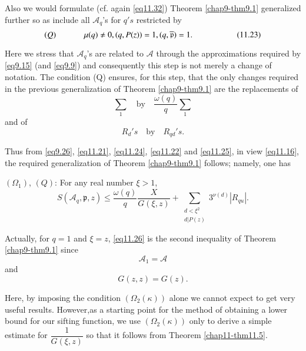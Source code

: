 Also we would formulate (cf. again \eqref{eq11.32}) Theorem
\ref{chap9-thm9.1} generalized further so as include all
$\mathscr{A}_q$'s for $q's$ restricted by  
\begin{equation*}
(Q) \hspace{1.2cm} \mu (q) \neq 0,  (q,P(z))=1,
  (q,\overline{\mathfrak{p}}) = 1. \hspace{1.2cm} 
\tag{11.23}\label{eq11.23} 
\end{equation*} 

Here we stress that $\mathscr{A}_q$'s are related to $\mathscr{A}$
through the approximations required by \eqref{eq9.15} (and \eqref{eq9.9}) and
consequently this step is not merely a change of notation. The
condition (Q) ensures, for this step, that the only changes required
in the previous generalization of Theorem \ref{chap9-thm9.1} are the
replacements of  
\begin{equation*}
\sum_1\quad \text{by}\quad \frac{\omega(q)}{q} \sum_1
\tag{11.24}\label{eq11.24} 
\end{equation*} 
and of
\begin{equation*}
R_d's \quad \text{by} \quad R_{qd}'s.\tag{11.25}\label{eq11.25} 
\end{equation*} 

Thus from \eqref{eq9.26}, \eqref{eq11.21}, \eqref{eq11.24},
\eqref{eq11.22} and \eqref{eq11.25},
in view \eqref{eq11.16}, the required generalization of Theorem
\ref{chap9-thm9.1} follows; namely, one has  

\begin{theorem}\label{chap11-thm11.5}
$(\Omega_1)$, $(Q)$: For any real number $\xi > 1$,
\begin{equation*}
S(\mathscr{A}_q, \mathfrak{p},z) \le \frac{\omega(q)} {q} \frac{X} {G
  (\xi,z)} + \sum_{\substack{d<\xi^2 \\ d|P(z)}} 3^{\nu(d)}
|R_{qu}|. \tag{11.26}\label{eq11.26} 
\end{equation*} 

Actually, for $q = 1$ and $\xi =z$, \eqref{eq11.26} is the second
inequality of Theorem \ref{chap9-thm9.1} since 
\begin{equation*}
\mathscr{A}_1 = \mathscr{A}\tag{11.27}
\end{equation*}\pageoriginale
and
\begin{equation*}
G (z,z) = G(z).\tag{11.28}\label{eq11.28}
\end{equation*} 
\end{theorem}

Here, by imposing the condition $(\Omega_2(\kappa))$ alone we cannot expect
to get very useful results. However,as a starting point for the method
of obtaining a lower bound for our sifting function, we use
$(\Omega_2(\kappa))$ only to derive a simple estimate for
$\dfrac{1}{G(\xi,z)}$ so that it follows from Theorem
\ref{chap11-thm11.5}.   


